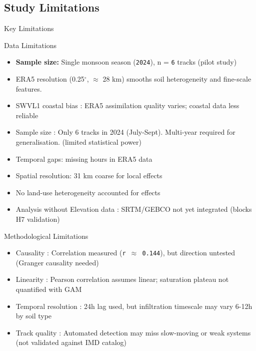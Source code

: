 \subsection{Study Limitations}
\begin{frame}{Key Limitations}
	\vspace{-0.2cm}
	\begin{block}{\small Data Limitations}
		\footnotesize
		\begin{itemize}
			\item \textbf{Sample size:} Single monsoon season (\texttt{2024}), n = \texttt{6} tracks (pilot study)
			\item ERA5 resolution (0.25$^\circ$, $\approx$ 28 km) smooths soil heterogeneity and fine-scale features.
			\item SWVL1 coastal bias : ERA5 assimilation quality varies; coastal data less reliable
			\item Sample size : Only 6 tracks in 2024 (July-Sept). Multi-year required for generalisation. (limited statistical power)
			\item Temporal gaps: missing hours in ERA5 data
			\item Spatial resolution: 31 km coarse for local effects
			\item No land-use heterogeneity accounted for effects
			\item Analysis without Elevation data : SRTM/GEBCO not yet integrated (blocks H7 validation)
		\end{itemize}
	\end{block}

	\vspace{-0.3cm}
	\begin{block}{\small Methodological Limitations}
		\footnotesize
		\begin{itemize}
			\item Causality : Correlation measured (\texttt{r $\approx$ 0.144}), but direction untested (Granger causality needed)
			\item Linearity : Pearson correlation assumes linear; saturation plateau not quantified with GAM
			\item Temporal resolution : 24h lag used, but infiltration timescale may vary 6-12h by soil type
			\item Track quality : Automated detection may miss slow-moving or weak systems (not validated against IMD catalog)
		\end{itemize}
	\end{block}


\end{frame}
